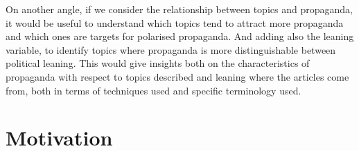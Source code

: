 On another angle, if we consider the relationship between topics and propaganda, it would be useful to understand which topics tend to attract more propaganda and which ones are targets for polarised propaganda. And adding also the leaning variable, to identify topics where propaganda is more distinguishable between political leaning. This would give insights both on the characteristics of propaganda with respect to topics described and leaning where the articles come from, both in terms of techniques used and specific terminology used. 














\section{\statusgreen Motivation}
\label{sec:intro_motivation}

